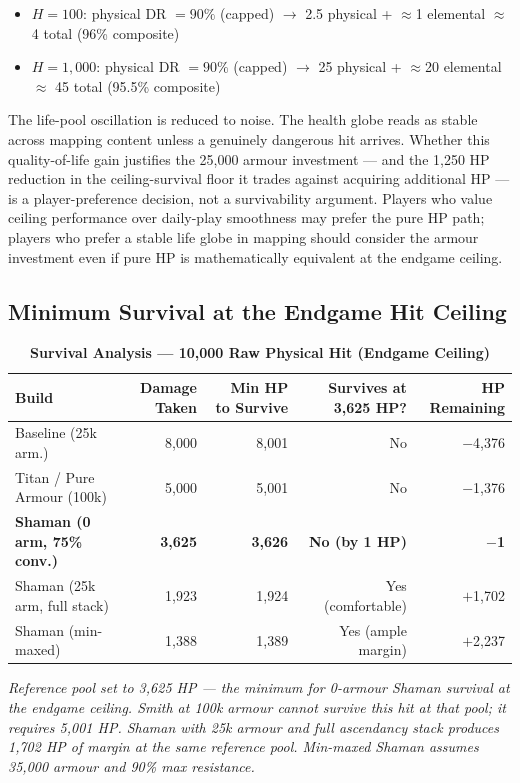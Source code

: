 \documentclass[12pt, letterpaper]{article}
\begin{document}
\begin{itemize}
    \item $H = 100$: physical DR $= 90\%$ (capped) $\to$ 2.5 physical + $\approx$1 elemental $\approx$ 4 total (96\% composite)
    \item $H = 1{,}000$: physical DR $= 90\%$ (capped) $\to$ 25 physical + $\approx$20 elemental $\approx$ 45 total (95.5\% composite)
\end{itemize}

The life-pool oscillation is reduced to noise. The health globe reads as stable across mapping content unless a genuinely dangerous hit arrives. Whether this quality-of-life gain justifies the 25{,}000 armour investment --- and the 1{,}250 HP reduction in the ceiling-survival floor it trades against acquiring additional HP --- is a player-preference decision, not a survivability argument. Players who value ceiling performance over daily-play smoothness may prefer the pure HP path; players who prefer a stable life globe in mapping should consider the armour investment even if pure HP is mathematically equivalent at the endgame ceiling.

\subsection*{Minimum Survival at the Endgame Hit Ceiling}

\begin{table}[htbp]
\centering
\caption{\textbf{Survival Analysis --- 10{,}000 Raw Physical Hit (Endgame Ceiling)}}
\begin{tabular}{lrrrr}
\toprule
\textbf{Build} & \textbf{Damage Taken} & \textbf{Min HP to Survive} & \textbf{Survives at 3{,}625 HP?} & \textbf{HP Remaining} \\
\midrule
\rowcolor{rowalt} Baseline (25k arm.) & 8{,}000 & 8{,}001 & No & $-$4{,}376 \\
Titan / Pure Armour (100k) & 5{,}000 & 5{,}001 & No & $-$1{,}376 \\
\rowcolor{rowalt} \textbf{Shaman (0 arm, 75\% conv.)} & \textbf{3{,}625} & \textbf{3{,}626} & \textbf{No (by 1 HP)} & \textbf{$-$1} \\
Shaman (25k arm, full stack) & 1{,}923 & 1{,}924 & Yes (comfortable) & $+$1{,}702 \\
\rowcolor{rowhi} Shaman (min-maxed) & 1{,}388 & 1{,}389 & Yes (ample margin) & $+$2{,}237 \\
\bottomrule
\end{tabular}
\smallskip
\begin{minipage}{\linewidth}
\small\textit{Reference pool set to 3{,}625 HP --- the minimum for 0-armour Shaman survival at the endgame ceiling. Smith at 100k armour cannot survive this hit at that pool; it requires 5{,}001 HP. Shaman with 25k armour and full ascendancy stack produces 1{,}702 HP of margin at the same reference pool. Min-maxed Shaman assumes 35{,}000 armour and 90\% max resistance.}
\end{minipage}
\end{table}
\end{document}
